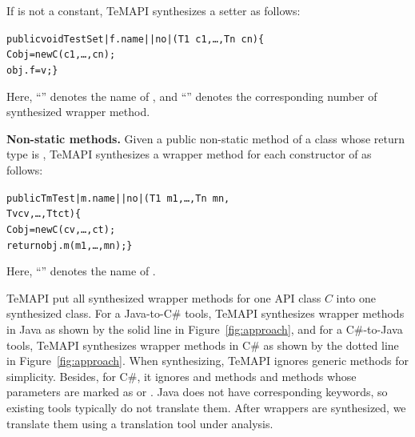 If  is not a constant, TeMAPI synthesizes a setter as follows:

\begin{CodeOut}\vspace*{-1ex}
\begin{alltt}
 public void TestSet|f.name||no|(T1\ c1,\ldots, Tn\ cn)\{
   C obj = new C(c1,\ldots, cn);
   obj.f = v; \}
\end{alltt}
\end{CodeOut}\vspace*{-1ex}

Here, ``'' denotes the name of , and ``'' denotes the corresponding number of synthesized wrapper method.

\textbf{Non-static methods.} Given a public non-static method  of a class  whose return type is , TeMAPI synthesizes a wrapper method for each constructor  of  as follows:

\begin{CodeOut}\vspace*{-1ex}
\begin{alltt}
 public Tm Test|m.name||no|(T1\ m1,\ldots, Tn\ mn,
                            Tv cv, \ldots, Tt ct)\{
   C obj = new C(cv,\ldots, ct);
   return obj.m(m1,\ldots, mn); \}
\end{alltt}
\end{CodeOut}\vspace*{-1ex}

Here, ``'' denotes the name of .

TeMAPI put all synthesized wrapper methods for one API class $C$ into one synthesized class. For a Java-to-C\# tools, TeMAPI synthesizes wrapper methods in Java as shown by the solid line in Figure~\ref{fig:approach}, and for a C\#-to-Java tools, TeMAPI synthesizes wrapper methods in C\# as shown by the dotted line in Figure~\ref{fig:approach}. When synthesizing, TeMAPI ignores generic methods for simplicity. Besides, for C\#, it ignores  and  methods and methods whose parameters are marked as  or . Java does not have corresponding keywords, so existing tools typically do not translate them. After wrappers are synthesized, we translate them using a translation tool under analysis.

